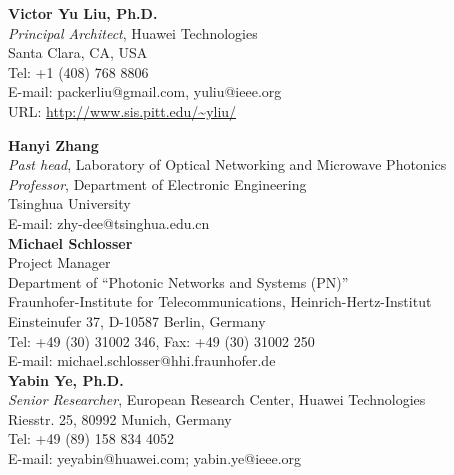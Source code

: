 \documentclass[letterpaper,11pt]{article}
\begin{document}
\vspace{0.2in}%
\textbf{Victor Yu Liu, Ph.D.}\\
\textit{Principal Architect}, Huawei Technologies\\
Santa Clara, CA, USA\\
Tel: +1 (408) 768 8806\\
E-mail: packerliu@gmail.com, yuliu@ieee.org\\ %
URL: \url{http://www.sis.pitt.edu/~yliu/}


\vspace{0.2in}%
\textbf{Hanyi Zhang}\\
\textit{Past head}, Laboratory of Optical Networking and Microwave
Photonics\\
\textit{Professor}, Department of Electronic Engineering\\
Tsinghua University\\
E-mail: zhy-dee@tsinghua.edu.cn\\


\vspace{0.2in}%
\textbf{Michael Schlosser}\\
Project Manager\\
Department of ``Photonic Networks and Systems (PN)''\\
Fraunhofer-Institute for Telecommunications, Heinrich-Hertz-Institut\\
Einsteinufer 37, D-10587 Berlin, Germany\\
Tel: +49 (30) 31002 346, Fax: +49 (30) 31002 250\\
E-mail: michael.schlosser@hhi.fraunhofer.de\\ %


\vspace{0.2in}%
\textbf{Yabin Ye, Ph.D.}\\
\textit{Senior Researcher}, European Research Center, Huawei Technologies\\
Riesstr. 25, 80992 Munich, Germany\\
Tel: +49 (89) 158 834 4052\\
E-mail: yeyabin@huawei.com; yabin.ye@ieee.org\\
\end{document}
